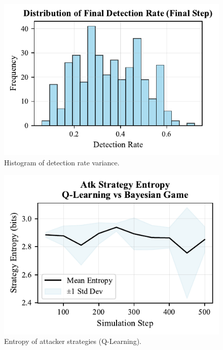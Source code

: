 \documentclass[conference]{IEEEtran}
\begin{document}
\begin{figure}[h!]
    \centering
    \includegraphics[width=0.9\linewidth]{figures/appendix/fig_detection_variance_histogram.pdf}
    \caption{Histogram of detection rate variance.}
\end{figure}

\begin{figure}[h!]
    \centering
    \includegraphics[width=0.9\linewidth]{figures/appendix/fig_entropy_atk_Q_learning.pdf}
    \caption{Entropy of attacker strategies (Q-Learning).}
\end{figure}
\end{document}
